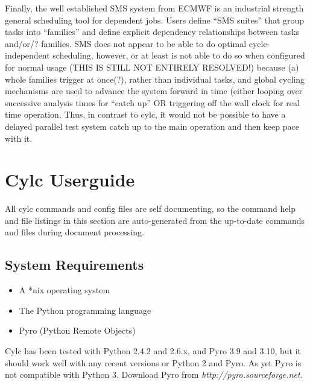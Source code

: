 \documentclass[11pt,a4paper]{article}
\begin{document}
Finally, the well established SMS system from ECMWF is an industrial
strength general scheduling tool for dependent jobs. Users define ``SMS
suites'' that group tasks into ``families'' and define explicit
dependency relationships between tasks and/or/? families. SMS does not
appear to be able to do optimal cycle-independent scheduling, however,
or at least is not able to do so when configured for normal usage (THIS
IS STILL NOT ENTIRELY RESOLVED!) because (a) whole families trigger 
at once(?), rather than individual tasks, and global cycling mechanisms
are used to advance the system forward in time (either looping
over successive analysis times for ``catch up'' OR triggering off the
wall clock for real time operation. Thus, in contrast to cylc, it would
not be possible to have a delayed parallel test system catch up to the
main operation and then keep pace with it.




\pagebreak
\section{Cylc Userguide}
\label{sec:usage}

All cylc commands and config files are self documenting, so the command
help and file listings in this section are auto-generated from the
up-to-date commands and files during document processing.

\subsection{System Requirements}

\begin{itemize}
    \item A *nix operating system
    \item The Python programming language
    \item Pyro (Python Remote Objects)
\end{itemize}

Cylc has been tested with Python 2.4.2 and 2.6.x, and Pyro 3.9 and 3.10,
but it should work well with any recent versions or Python 2 and Pyro.
As yet Pyro is not compatible with Python 3. Download Pyro from {\em
http://pyro.sourceforge.net}. 
\end{document}
